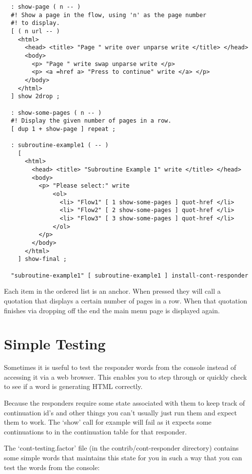 \begin{verbatim}
  : show-page ( n -- )
  #! Show a page in the flow, using 'n' as the page number
  #! to display. 
  [ ( n url -- )
    <html>
      <head> <title> "Page " write over unparse write </title> </head>
      <body>
        <p> "Page " write swap unparse write </p>
        <p> <a =href a> "Press to continue" write </a> </p>
      </body>
    </html>   
  ] show 2drop ;

  : show-some-pages ( n -- )
  #! Display the given number of pages in a row.
  [ dup 1 + show-page ] repeat ;

  : subroutine-example1 ( -- )
    [
      <html>
        <head> <title> "Subroutine Example 1" write </title> </head>
        <body>
          <p> "Please select:" write 
              <ol>
                <li> "Flow1" [ 1 show-some-pages ] quot-href </li>
                <li> "Flow2" [ 2 show-some-pages ] quot-href </li>
                <li> "Flow3" [ 3 show-some-pages ] quot-href </li>
              </ol>
          </p>
        </body>
      </html>
    ] show-final ;

  "subroutine-example1" [ subroutine-example1 ] install-cont-responder
\end{verbatim}

Each item in the ordered list is an anchor. When pressed they will
call a quotation that displays a certain number of pages in a
row. When that quotation finishes via dropping off the end the main
menu page is displayed again.

\section{Simple Testing}

Sometimes it is useful to test the responder words from the console
instead of accessing it via a web browser. This enables you to step
through or quickly check to see if a word is generating HTML
correctly.

Because the responders require some state associated with them to keep
track of continuation id's and other things you can't usually just run
them and expect them to work. The `show' call for example will fail as
it expects some continuations to in the continuation table for that
responder.

The `cont-testing.factor' file (in the contrib/cont-responder
directory) contains some simple words that maintains this state for
you in such a way that you can test the words from the console:

